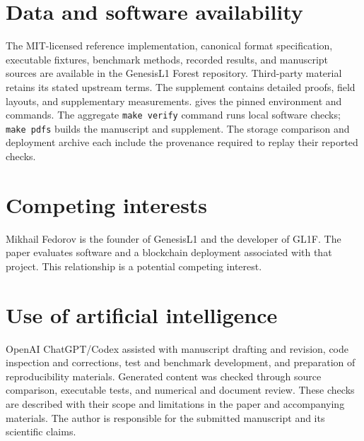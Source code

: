\documentclass{ledger}
\newcommand{\codeword}[1]{\texttt{#1}}
\begin{document}
\ledgernotes
\section*{Data and software availability}

The MIT-licensed reference implementation, canonical format specification,
executable fixtures, benchmark methods, recorded results, and manuscript
sources are available in the GenesisL1 Forest repository.\cite{gl1frepository}
Third-party material retains its stated upstream terms. The supplement
contains detailed proofs, field layouts, and supplementary measurements.
 gives the pinned environment and commands. The
aggregate \codeword{make verify} command runs local software checks;
\codeword{make pdfs} builds the manuscript and supplement. The storage
comparison and deployment archive each include the provenance required to
replay their reported checks.

\section*{Competing interests}

Mikhail Fedorov is the founder of GenesisL1 and the developer of GL1F. The
paper evaluates software and a blockchain deployment associated with that
project. This relationship is a potential competing interest.

\section*{Use of artificial intelligence}

OpenAI ChatGPT/Codex assisted with manuscript drafting and revision, code
inspection and corrections, test and benchmark development, and preparation
of reproducibility materials. Generated content was checked through source
comparison, executable tests, and numerical and document review. These checks
are described with their scope and limitations in the paper and accompanying
materials. The author is responsible for the submitted manuscript and its
scientific claims.



\end{document}
